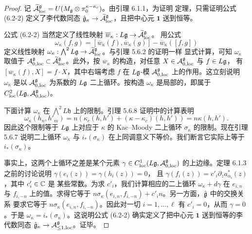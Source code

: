 \begin{proof}
    记 $\widetilde{\mathcal{A}}^{\mathfrak g}_{\mathrm{loc}}
    =U(M_{\mathfrak g}\otimes\pi_0^{\kappa-\kappa_c})$。由引理 6.1.1，为证明
    定理，只需证明公式 (6.2-2) 定义了李代数同态
    $\hat{\mathfrak{g}}_\kappa\to\widetilde{\mathcal{A}}^{\mathfrak g}_{\mathrm{loc}}$，且把中心元
    $\mathbf 1$ 送到恒等。

    公式 (6.2-2) 当然定义了线性映射
    $\overline w_\kappa:L\mathfrak{g}\to\widetilde{\mathcal{A}}^{\mathfrak g}_{\mathrm{loc}}$。
    用公式
    \[
        \omega_\kappa(f,g)=\left[\overline w_\kappa(f),
        \overline w_\kappa(g)\right]-\overline w_\kappa([f,g])
    \]
    定义线性映射 $\omega_\kappa:\bigwedge^2L\mathfrak{g}\to
    \widetilde{\mathcal{A}}^{\mathfrak g}_{\mathrm{loc}}$。与引理 5.6.2 的证明一样
    显式计算，可知 $\omega_\kappa$ 取值于
    $\mathcal{A}^{\mathfrak g}_{0,\mathrm{loc}}\subset
    \widetilde{\mathcal{A}}^{\mathfrak g}_{\mathrm{loc}}$。此外，按 $\overline w_\kappa$
    的构造，对任意 $X\in\mathcal{A}^{\mathfrak g}_{0,\mathrm{loc}}$ 与 $f\in L\mathfrak{g}$，
    有 $[\overline w_\kappa(f),X]=f\cdot X$，其中右端考虑 $f$ 在
    $L\mathfrak{g}$-模 $\mathcal{A}^{\mathfrak g}_{0,\mathrm{loc}}$ 上的作用。这立刻说明
    $\omega_\kappa$ 是以 $\mathcal{A}^{\mathfrak g}_{0,\mathrm{loc}}$ 为系数的
    $L\mathfrak{g}$ 二上循环。按构造 $\omega_\kappa$ 是局部的，即属于
    $C^2_{\mathrm{loc}}(L\mathfrak{g},\mathcal{A}^{\mathfrak g}_{0,\mathrm{loc}})$。

    下面计算 $\omega_\kappa$ 在 $\bigwedge^2L\mathfrak h$ 上的限制。引理
    5.6.8 证明中的计算表明
    \[
        \omega_\kappa(h_n,h'_m)
        =n\left(\kappa_c(h,h')+(\kappa-\kappa_c)(h,h')\right)
        =n\kappa(h,h').
    \]
    因此这个限制等于 $L\mathfrak{g}$ 上对应于 $\kappa$ 的 Kac--Moody 二上循环
    $\sigma_\kappa$ 的限制。现在引理 5.6.7 说明二上循环 $\omega_\kappa$ 与
    $i_*(\sigma_\kappa)$ 在上同调意义下等价。我们断言它实际上等于
    $i_*(\sigma_\kappa)$。

    事实上，这两个上循环之差是某个元素
    $\gamma\in C^1_{\mathrm{loc}}(L\mathfrak{g},\mathcal{A}^{\mathfrak g}_{0,\mathrm{loc}})$
    的上边缘。定理 6.1.3 之前的讨论说明 $\gamma(e_i(z))=\gamma(h_i(z))=0$，
    且 $\gamma(f_i(z))=c'_i\partial_za^*_{\alpha_i}(z)$，其中 $c'_i\in\mathbb{C}$ 是
    某些常数。为求 $c'_i$，我们计算相应的二上循环 $\omega_\kappa+d\gamma$ 在
    $e_{i,n}$ 与 $f_{i,-n}$ 上的值。求得它等于
    $n\sigma_\kappa(e_{i,n},f_{i,-n})+c'_in$。另一方面，$\hat{\mathfrak{g}}$ 中的交换关系
    要求它等于 $n\sigma_\kappa(e_{i,n},f_{i,-n})$。因此对一切
    $i=1,\dots,\ell$ 有 $c'_i=0$，从而 $\gamma=0$。于是
    $\omega_\kappa=i_*(\sigma_\kappa)$。这说明公式 (6.2-2) 确实定义了把中心元
    $\mathbf 1$ 送到恒等的李代数同态
    $\hat{\mathfrak{g}}_\kappa\to\mathcal{A}^{\mathfrak g}_{\le1,\mathrm{loc}}$。证毕。
\end{proof}

